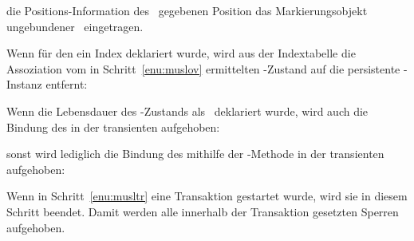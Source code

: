 \begin{infol}
\begin{block}
die Po\-si\-tions-In\-for\-ma\-tion des \sltdo[es]\ gegebenen Position
das Markierungsobjekt \rglq{}ungebundener \Slt\rgrq\ eingetragen.
%
\item Wenn f\"{u}r den \Slt\/ ein Index deklariert wurde, wird
aus der Indextabelle die Assoziation vom in
Schritt~\ref{enu:muslov} ermittelten \Slt\/-Zustand auf die
persistente \clos-Instanz entfernt:\\
%
\item Wenn die Lebensdauer des \Slt\/-Zustands als
\ deklariert wurde, wird auch die Bindung
des \Slt[s]\/ in der transienten \representation{} aufgehoben:\\
%
\end{block}
%
\item sonst wird lediglich die Bindung des \Slt[s]\/ mithilfe der
\std-Methode in der transienten \representation{} aufgehoben:\\
%
\item Wenn in Schritt~\ref{enu:musltr} eine Transaktion gestartet
wurde, wird sie in diesem Schritt beendet. Damit werden alle innerhalb
der Transaktion gesetzten Sperren aufgehoben.
%
\end{infol}
%
%
